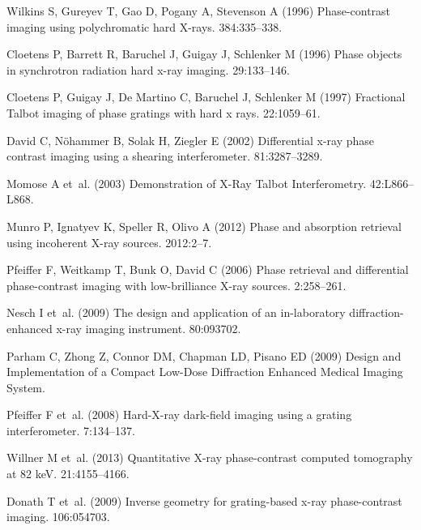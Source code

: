 \documentclass{pnastwo}
\begin{document}
\begin{article}
\begin{thebibliography}{10}
Wilkins S, Gureyev T, Gao D, Pogany A, Stevenson A (1996) {Phase-contrast
  imaging using polychromatic hard X-rays}.
 384:335--338.

Cloetens P, Barrett R, Baruchel J, Guigay J, Schlenker M (1996) {Phase objects
  in synchrotron radiation hard x-ray imaging}.
 29:133--146.

Cloetens P, Guigay J, {De Martino} C, Baruchel J, Schlenker M (1997)
  {Fractional Talbot imaging of phase gratings with hard x rays.}
 22:1059--61.

David C, N\"{o}hammer B, Solak H, Ziegler E (2002) {Differential x-ray phase
  contrast imaging using a shearing interferometer}.
 81:3287--3289.

Momose A et~al. (2003) {Demonstration of X-Ray Talbot Interferometry}.
 42:L866--L868.

Munro P, Ignatyev K, Speller R, Olivo A (2012) {Phase and absorption retrieval
  using incoherent X-ray sources}.
 2012:2--7.

Pfeiffer F, Weitkamp T, Bunk O, David C (2006) {Phase retrieval and
  differential phase-contrast imaging with low-brilliance X-ray sources}.
 2:258--261.

Nesch I et~al. (2009) {The design and application of an in-laboratory
  diffraction-enhanced x-ray imaging instrument.}
 80:093702.

Parham C, Zhong Z, Connor DM, Chapman LD, Pisano ED (2009) {Design and
  Implementation of a Compact Low-Dose Diffraction Enhanced Medical Imaging
  System}.

Pfeiffer F et~al. (2008) {Hard-X-ray dark-field imaging using a grating
  interferometer}.
 7:134--137.

Willner M et~al. (2013) {Quantitative X-ray phase-contrast computed tomography
  at 82 keV}.
 21:4155--4166.

Donath T et~al. (2009) {Inverse geometry for grating-based x-ray phase-contrast
  imaging}.
 106:054703.


\end{thebibliography}
\end{article}
\end{document}
